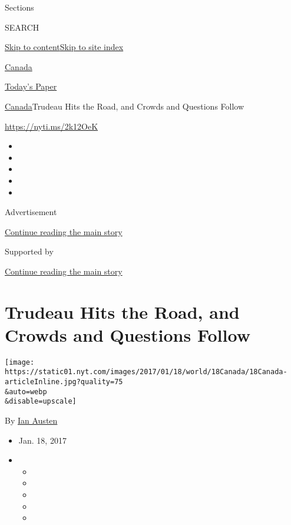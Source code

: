 Sections

SEARCH

\protect\hyperlink{site-content}{Skip to
content}\protect\hyperlink{site-index}{Skip to site index}

\href{https://www.nytimes.com/section/world/canada}{Canada}

\href{https://myaccount.nytimes.com/auth/login?response_type=cookie\&client_id=vi}{}

\href{https://www.nytimes.com/section/todayspaper}{Today's Paper}

\href{/section/world/canada}{Canada}\textbar{}Trudeau Hits the Road, and
Crowds and Questions Follow

\url{https://nyti.ms/2k12OeK}

\begin{itemize}
\item
\item
\item
\item
\item
\end{itemize}

Advertisement

\protect\hyperlink{after-top}{Continue reading the main story}

Supported by

\protect\hyperlink{after-sponsor}{Continue reading the main story}

\hypertarget{trudeau-hits-the-road-and-crowds-and-questions-follow}{%
\section{Trudeau Hits the Road, and Crowds and Questions
Follow}\label{trudeau-hits-the-road-and-crowds-and-questions-follow}}

\texttt{[image: https://static01.nyt.com/images/2017/01/18/world/18Canada/18Canada-articleInline.jpg?quality=75\\\&auto=webp\\\&disable=upscale]}

By \href{http://www.nytimes.com/by/ian-austen}{Ian Austen}

\begin{itemize}
\item
  Jan. 18, 2017
\item
  \begin{itemize}
  \item
  \item
  \item
  \item
  \item
  \end{itemize}
\end{itemize}

